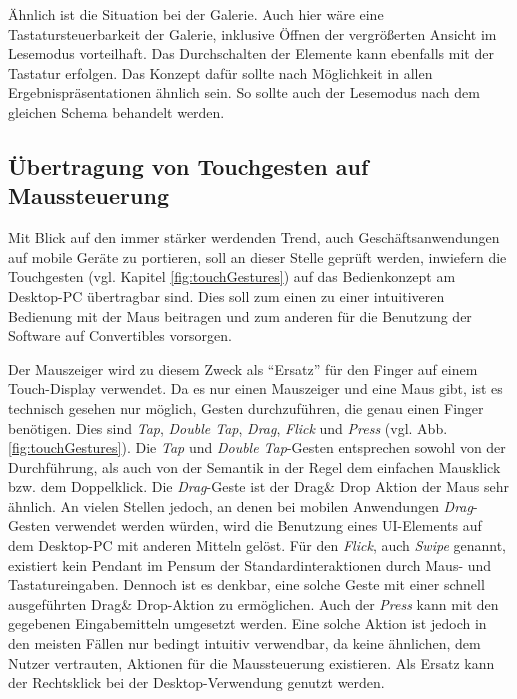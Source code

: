 Ähnlich ist die Situation bei der Galerie. Auch hier wäre eine Tastatursteuerbarkeit der Galerie, inklusive Öffnen der vergrößerten Ansicht im Lesemodus vorteilhaft. Das Durchschalten der Elemente kann ebenfalls mit der Tastatur erfolgen. Das Konzept dafür sollte nach Möglichkeit in allen Ergebnispräsentationen ähnlich sein. So sollte auch der Lesemodus nach dem gleichen Schema behandelt werden.\par
\subsection{Übertragung von Touchgesten auf Maussteuerung} \label{sec:analyseGesten}
Mit Blick auf den immer stärker werdenden Trend, auch Geschäftsanwendungen auf mobile Geräte zu portieren, soll an dieser Stelle geprüft werden, inwiefern die Touchgesten (vgl. Kapitel \ref{fig:touchGestures}) auf das Bedienkonzept am Desktop-PC übertragbar sind. Dies soll zum einen zu einer intuitiveren Bedienung mit der Maus beitragen und zum anderen für die Benutzung der Software auf Convertibles vorsorgen.\par
Der Mauszeiger wird zu diesem Zweck als \enquote{Ersatz} für den Finger auf einem Touch-Display verwendet. Da es nur einen Mauszeiger und eine Maus gibt, ist es technisch gesehen nur möglich, Gesten durchzuführen, die genau einen Finger benötigen. Dies sind \textit{Tap}, \textit{Double Tap}, \textit{Drag}, \textit{Flick} und \textit{Press} (vgl. Abb. \ref{fig:touchGestures}). Die \textit{Tap} und \textit{Double Tap}-Gesten entsprechen sowohl von der Durchführung, als auch von der Semantik in der Regel dem einfachen Mausklick bzw. dem Doppelklick. Die \textit{Drag}-Geste ist der Drag\& Drop Aktion der Maus sehr ähnlich. An vielen Stellen jedoch, an denen bei mobilen Anwendungen \textit{Drag}-Gesten verwendet werden würden, wird die Benutzung eines UI-Elements auf dem Desktop-PC mit anderen Mitteln gelöst. Für den \textit{Flick}, auch \textit{Swipe} genannt, existiert kein Pendant im Pensum der Standardinteraktionen durch Maus- und Tastatureingaben. Dennoch ist es denkbar, eine solche Geste mit einer schnell ausgeführten Drag\& Drop-Aktion zu ermöglichen. Auch der \textit{Press} kann mit den gegebenen Eingabemitteln umgesetzt werden. Eine solche Aktion ist jedoch in den meisten Fällen nur bedingt intuitiv verwendbar, da keine ähnlichen, dem Nutzer vertrauten, Aktionen für die Maussteuerung existieren. Als Ersatz kann der Rechtsklick bei der Desktop-Verwendung genutzt werden.\par
